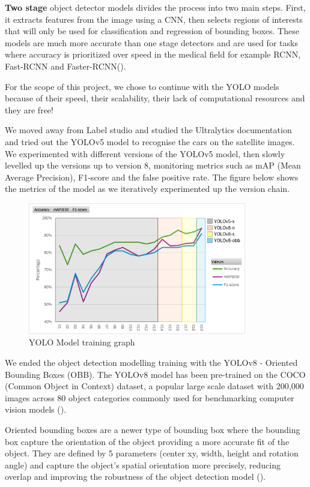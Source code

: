 \textbf{Two stage} object detector models divides the process into two main
steps. First, it extracts features from the image using a CNN, then selects
regions of interests that will only be used for classification and regression of
bounding boxes. These models are much more accurate than one stage detectors and
are used for tasks where accuracy is prioritized over speed in the medical field
for example RCNN, Fast-RCNN and Faster-RCNN(\cite{singlevstwostagedetectors}).

For the scope of this project, we chose to continue with the YOLO models because
of their speed, their scalability, their lack of computational resources and
they are free!

We moved away from Label studio and studied the Ultralytics documentation and
tried out the YOLOv5 model to recognise the cars on the satellite images. We
experimented with different versions of the YOLOv5 model, then slowly levelled
up the versions up to version 8, monitoring metrics such as mAP (Mean Average
Precision), F1-score and the false positive rate. The figure below shows the
metrics of the model as we iteratively experimented up the version chain.

\begin{figure}[htbp]
  \centering
  \includegraphics[width=0.85\textwidth]{images/yolo-results.png}
  \caption{YOLO Model training graph}
\end{figure}

We ended the object detection modelling training with the YOLOv8 - Oriented
Bounding Boxes (OBB). The YOLOv8 model has been pre-trained on the COCO (Common
Object in Context) dataset, a popular large scale dataset with 200,000 images
across 80 object categories commonly used for benchmarking computer vision
models (\cite{cocodataset}).

Oriented bounding boxes are a newer type of bounding box where the bounding box
capture the orientation of the object providing a more accurate fit of the
object. They are defined by 5 parameters (center xy, width, height and rotation
angle) and capture the object's spatial orientation more precisely, reducing
overlap and improving the robustness of the object detection model
(\cite{obblit}).

